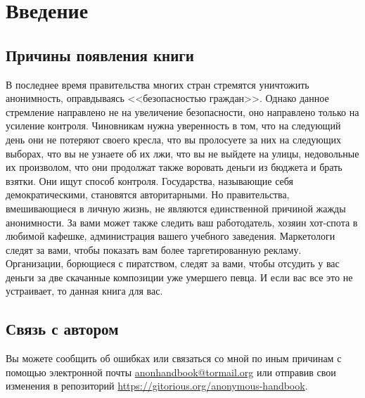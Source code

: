 \chapter{Введение}
\section{Причины появления книги}
В последнее время правительства многих стран стремятся уничтожить анонимность, оправдываясь <<безопасностью граждан>>. Однако данное стремление направлено не на увеличение безопасности, оно направлено только на усиление контроля. Чиновникам нужна уверенность в том, что на следующий день они не потеряют своего кресла, что вы пролосуете за них на следующих выборах, что вы не узнаете об их лжи, что вы не выйдете на улицы, недовольные их произволом, что они продолжат также воровать деньги из бюджета и брать взятки. Они ищут способ контроля. Государства, называющие себя демократическими, становятся авторитарными. Но правительства, вмешивающиеся в личную жизнь, не являются единственной причиной жажды анонимности. За вами может также следить ваш работодатель, хозяин хот-спота в любимой кафешке, администрация вашего учебного заведения. Маркетологи следят за вами, чтобы показать вам более таргетированную рекламу. Организации, борющиеся с пиратством, следят за вами, чтобы отсудить у вас деньги за две скачанные композиции уже умершего певца. И если вас все это не устраивает, то данная книга для вас.

\section{Связь с автором}
Вы можете сообщить об ошибках или связаться со мной по иным причинам с помощью электронной почты \href{mailto:anonhandbook@tormail.org}{anonhandbook@tormail.org} или отправив свои изменения в репозиторий \url{https://gitorious.org/anonymous-handbook}.